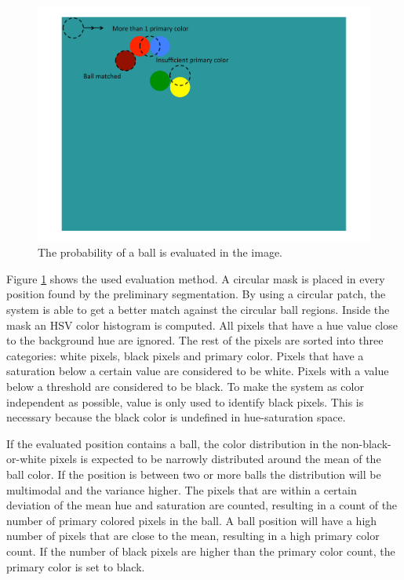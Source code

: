\begin{figure}[h]
\begin{center}
\includegraphics{images/ballfind.pdf}
\caption{The probability of a ball is evaluated in the image.}
\label{fig:ballfind}
\end{center}
\end{figure}
Figure \ref{fig:ballfind} shows the used evaluation method. A circular mask is placed in every position found by the preliminary segmentation. By using a circular patch, the system is able to get a better match against the circular ball regions. Inside the mask an HSV color histogram is computed. All pixels that have a hue value close to the background hue are ignored. The rest of the pixels are sorted into three categories: white pixels, black pixels and primary color. Pixels that have a saturation below a certain value are considered to be white. Pixels with a value below a threshold are considered to be black. To make the system as color independent as possible, value is only used to identify black pixels. This is necessary because the black color is undefined in hue-saturation space.

If the evaluated position contains a ball, the color distribution in the non-black-or-white pixels is expected to be narrowly distributed around the mean of the ball color. If the position is between two or more balls the distribution will be multimodal and the variance higher. The pixels that are within a certain deviation of the mean hue and saturation are counted, resulting in a count of the number of primary colored pixels in the ball. A ball position will have a high number of pixels that are close to the mean, resulting in a high primary color count. If the number of black pixels are higher than the primary color count, the primary color is set to black.

